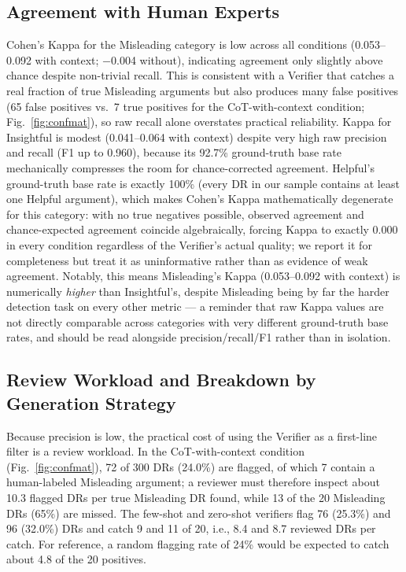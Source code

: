 \documentclass[runningheads]{llncs}
\begin{document}
\subsection{Agreement with Human Experts}
Cohen's Kappa for the Misleading category is low across all conditions (0.053--0.092 with context; $-$0.004 without), indicating agreement only slightly above chance despite non-trivial recall. This is consistent with a Verifier that catches a real fraction of true Misleading arguments but also produces many false positives (65 false positives vs.\ 7 true positives for the CoT-with-context condition; Fig.~\ref{fig:confmat}), so raw recall alone overstates practical reliability. Kappa for Insightful is modest (0.041--0.064 with context) despite very high raw precision and recall (F1 up to 0.960), because its 92.7\% ground-truth base rate mechanically compresses the room for chance-corrected agreement. Helpful's ground-truth base rate is exactly 100\% (every DR in our sample contains at least one Helpful argument), which makes Cohen's Kappa mathematically degenerate for this category: with no true negatives possible, observed agreement and chance-expected agreement coincide algebraically, forcing Kappa to exactly 0.000 in every condition regardless of the Verifier's actual quality; we report it for completeness but treat it as uninformative rather than as evidence of weak agreement. Notably, this means Misleading's Kappa (0.053--0.092 with context) is numerically \emph{higher} than Insightful's, despite Misleading being by far the harder detection task on every other metric --- a reminder that raw Kappa values are not directly comparable across categories with very different ground-truth base rates, and should be read alongside precision/recall/F1 rather than in isolation.

\subsection{Review Workload and Breakdown by Generation Strategy}
Because precision is low, the practical cost of using the Verifier as a first-line filter is a review workload. In the CoT-with-context condition (Fig.~\ref{fig:confmat}), 72 of 300 DRs (24.0\%) are flagged, of which 7 contain a human-labeled Misleading argument; a reviewer must therefore inspect about 10.3 flagged DRs per true Misleading DR found, while 13 of the 20 Misleading DRs (65\%) are missed. The few-shot and zero-shot verifiers flag 76 (25.3\%) and 96 (32.0\%) DRs and catch 9 and 11 of 20, i.e., 8.4 and 8.7 reviewed DRs per catch. For reference, a random flagging rate of 24\% would be expected to catch about 4.8 of the 20 positives.
\end{document}
